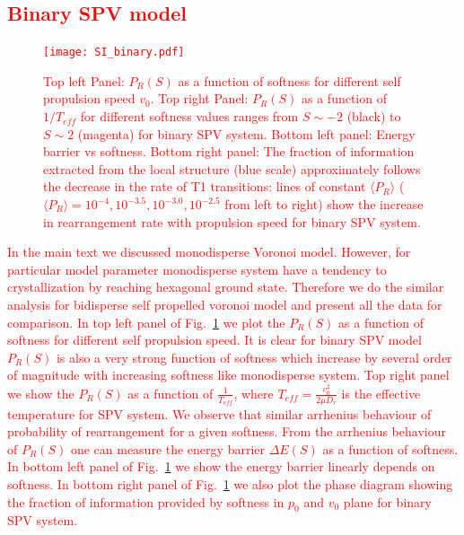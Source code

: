 \documentclass[twoside,twocolumn,9pt]{article}
\begin{document}
\textcolor{red}{
\section{Binary SPV model}
\begin{figure}%
\begin{center}
  \texttt{[image: SI\_binary.pdf]}
  \caption{\textcolor{red}{Top left Panel: $P_R(S)$ as a function of softness for different self propulsion speed $v_0$. Top right Panel: $P_R(S)$ as a function of  $1/T_{eff}$ for different softness values ranges from $S \sim -2$ (black) to $S \sim 2$ (magenta) for binary SPV system. Bottom left panel: Energy barrier vs softness. Bottom right panel: The fraction of information extracted from the local structure (blue scale) approximately follows the decrease in the rate of T1 transitions: lines of constant $\langle P_R \rangle$ ($\langle P_R \rangle = 10^{-4}, 10^{-3.5}, 10^{-3.0}, 10^{-2.5}$ from left to right) show the increase in rearrangement rate with propulsion speed for binary SPV system.}}
  \label{SI}
  \end{center}
\end{figure}
In the main text we discussed monodisperse Voronoi model. However, for particular model parameter monodisperse system have a tendency to crystallization by reaching hexagonal ground state. Therefore 
we do the similar analysis for bidisperse self propelled voronoi model and present all the data for comparison.
In top left panel of Fig.~\ref{SI} we plot the $P_R(S)$ as a function of softness for different self propulsion speed.
It is clear for binary SPV model $P_R(S)$ is also a very strong function of softness which increase by several order of magnitude with increasing softness like monodisperse system. Top right panel we show the $P_R(S)$ as a function of $\frac{1}{T_{eff}}$, where $T_{eff}=\frac{v_0^2}{2\mu D_r}$ is the effective temperature for SPV system. We observe that similar arrhenius behaviour of probability of rearrangement for a given softness. From the arrhenius behaviour of $P_R(S)$ one can measure the energy barrier $\Delta E (S)$ as a function of softness. In bottom left panel of Fig.~\ref{SI} we show the energy barrier linearly depends on softness. In bottom right panel of Fig.~\ref{SI} we also plot the phase diagram showing the fraction of information provided by softness in $p_0$ and $v_0$ plane for binary SPV system.  
}
\end{document}
